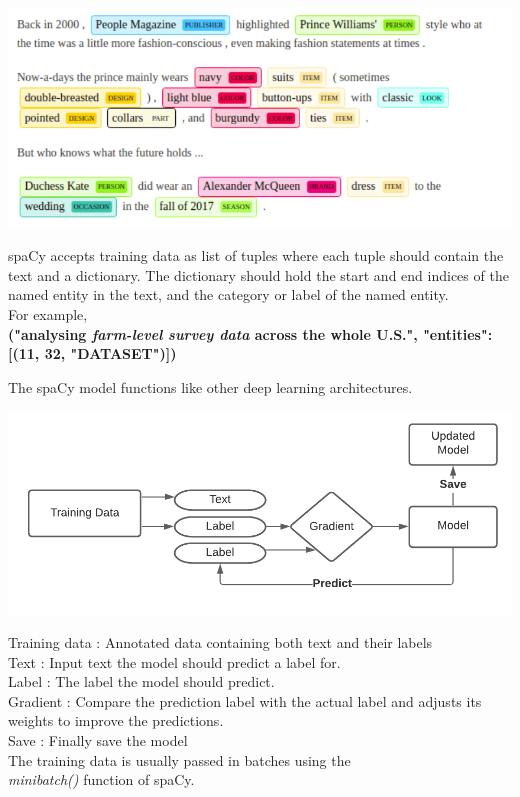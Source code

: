 \documentclass[twocolumn]{article}
\begin{document}
\begin{center}
\hspace*{-0.2cm}
\includegraphics[scale=0.37]{SpaCy NER.png}
\end{center}

spaCy accepts training data as list of tuples where each tuple should contain the text and a dictionary. The dictionary should hold the start and end indices of the named entity in the text, and the category or label of the named entity. \\ For example,\\ \textbf{("analysing \emph{farm-level survey data} across the whole U.S.", {"entities": [(11, 32, "DATASET")]})}

The spaCy model functions like other deep learning architectures. \par

\begin{center}
\hspace*{-0.2cm}
\includegraphics[scale=0.6]{SpaCy NER flow.png}
\end{center}

Training data : Annotated data containing both text and their labels\\Text : Input text the model should predict a label for.\\Label : The label the model should predict.\\Gradient : Compare the prediction label with the actual label and adjusts its weights to improve the predictions. \\Save : Finally save the model\\The training data is usually passed in batches using the\\\textit{minibatch()} function of spaCy.\par
\end{document}
